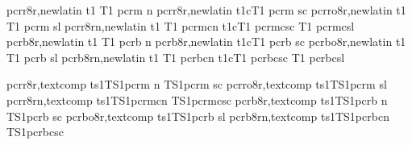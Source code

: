 

  {}
 {}
  {}
 {}

 {}
 {}

\installfonts
{}
  {pcrr8r,newlatin}  {t1} {T1} {pcr}{m} {n} {}
 {pcrr8r,newlatin}  {t1c}{T1} {pcr}{m} {sc}{}
 {pcrro8r,newlatin} {t1} {T1} {pcr}{m} {sl}{}
 {pcrr8rn,newlatin} {t1} {T1} {pcr}{mc}{n} {}
 {t1c}{T1} {pcr}{mc}{sc}{}
 {T1} {pcr}{mc}{sl}{}
  {pcrb8r,newlatin}  {t1} {T1} {pcr}{b} {n} {}
 {pcrb8r,newlatin}  {t1c}{T1} {pcr}{b} {sc}{}
 {pcrbo8r,newlatin} {t1} {T1} {pcr}{b} {sl}{}
 {pcrb8rn,newlatin} {t1} {T1} {pcr}{bc}{n} {}
 {t1c}{T1} {pcr}{bc}{sc}{}
 {T1} {pcr}{bc}{sl}{}
\endinstallfonts

\installfonts
{}
  {pcrr8r,textcomp}  {ts1}{TS1}{pcr}{m} {n} {}
                          {TS1}{pcr}{m} {sc}{}
 {pcrro8r,textcomp} {ts1}{TS1}{pcr}{m} {sl}{}
 {pcrr8rn,textcomp} {ts1}{TS1}{pcr}{mc}{n} {}
                         {TS1}{pcr}{mc}{sc}{}
  {pcrb8r,textcomp}  {ts1}{TS1}{pcr}{b} {n} {}
                          {TS1}{pcr}{b} {sc}{}
 {pcrbo8r,textcomp} {ts1}{TS1}{pcr}{b} {sl}{}
 {pcrb8rn,textcomp} {ts1}{TS1}{pcr}{bc}{n} {}
                         {TS1}{pcr}{bc}{sc}{}
\endinstallfonts

\bye
